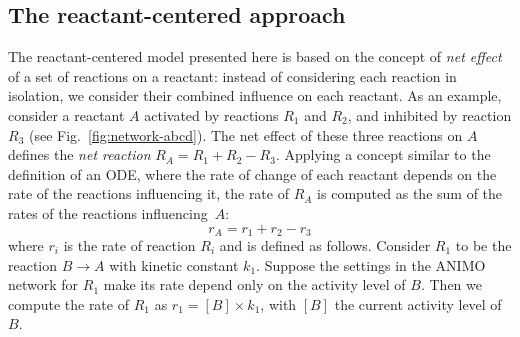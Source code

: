 \documentclass{llncs}
\begin{document}
\subsection{The reactant-centered approach}\label{sec:reactant-centered}
The reactant-centered model presented here is based on the concept of \emph{net effect} of a set of reactions on a reactant:
instead of considering each reaction in isolation, we consider their combined influence on each reactant.
As an example, consider a reactant $A$ activated by reactions $R_1$ and $R_2$, and inhibited
by reaction $R_3$ (see Fig.~\ref{fig:network-abcd}).
The net effect of these three reactions on $A$ defines the \emph{net reaction} $R_A = R_1 + R_2 - R_3.$
Applying a concept similar to the definition of an ODE,
where the rate of change of each reactant depends on the rate of the reactions influencing it,
the rate of $R_A$ is computed as the sum of the rates of the reactions influencing~$A$: 
$$r_A = r_1 + r_2 - r_3$$
where $r_i$ is the rate of reaction $R_i$ and is defined as follows.
Consider $R_1$ to be the reaction $B \rightarrow A$ with kinetic constant $k_1$.
Suppose the settings in the ANIMO network for $R_1$ make its rate depend only on the
activity level of $B$. Then we compute the rate of $R_1$ as $r_1 = [B] \times k_1$, with
$[B]$ the current activity level of $B$.
\end{document}
